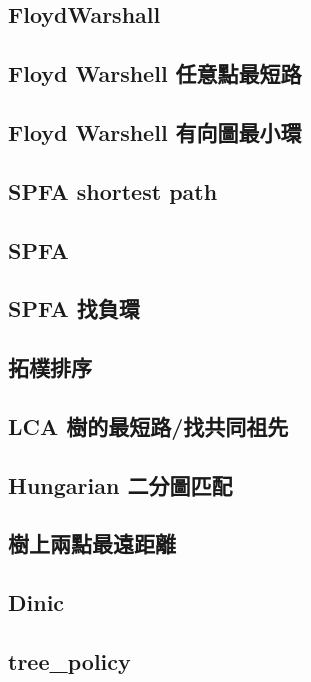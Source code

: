 \subsection{FloydWarshall}

\subsection{Floyd Warshell 任意點最短路}

\subsection{Floyd Warshell 有向圖最小環}

\subsection{SPFA shortest path}

\subsection{SPFA}

\subsection{SPFA 找負環}

\subsection{拓樸排序}

\subsection{LCA 樹的最短路/找共同祖先}

\subsection{Hungarian 二分圖匹配}

\subsection{樹上兩點最遠距離}

\subsection{Dinic}

\subsection{tree_policy}

